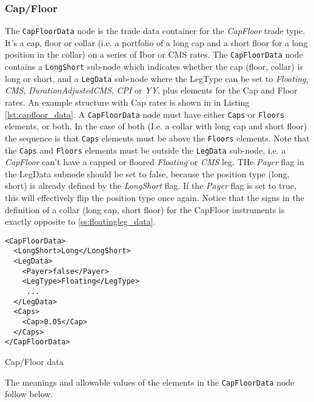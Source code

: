 \subsubsection{Cap/Floor}
\label{ss:capfloor}

The \lstinline!CapFloorData! node is the trade data container for the \emph{CapFloor} trade type.  It's a cap, floor or collar
(i.e. a portfolio of a long cap and a short floor for a long position in the collar) on a series of Ibor or CMS rates. The
\lstinline!CapFloorData! node contains a \lstinline!LongShort! sub-node which indicates whether the cap (floor, collar)
is long or short, and a \lstinline!LegData!  sub-node where the
LegType can be set to \emph{Floating}, \emph{CMS}, \emph{DurationAdjustedCMS}, \emph{CPI}
or \emph{YY}, plus elements for the Cap and Floor rates. An example structure with Cap rates is shown in in Listing
\ref{lst:capfloor_data}. A \lstinline!CapFloorData! node must have either \lstinline!Caps! or \lstinline!Floors!
elements, or both. In the case of both (I.e. a collar with long cap and short floor) the sequence is that  \lstinline!Caps! elements must be above the \lstinline!Floors! elements. Note that 
the \lstinline!Caps! and \lstinline!Floors! elements must be outside the \lstinline!LegData! sub-node, i.e. a \emph{CapFloor} 
can't have a capped or floored  \emph{Floating}  or \emph{CMS} leg.
THe \emph{Payer} flag in the LegData subnode should be set to false, because the position type (long, short) is already
defined by the \emph{LongShort} flag. If the \emph{Payer} flag is set to true, this will effectively flip the position
type once again. Notice that the signs in the definition of a collar (long cap, short floor) for the CapFloor
instruments is exactly opposite to \ref{ss:floatingleg_data}.

\begin{listing}[H]
\begin{verbatim}
<CapFloorData>
  <LongShort>Long</LongShort>
  <LegData>
    <Payer>false</Payer>
    <LegType>Floating</LegType>
     ...
  </LegData>
  <Caps>
    <Cap>0.05</Cap>
  </Caps>
</CapFloorData>
\end{verbatim}
\caption{Cap/Floor data}
\label{lst:capfloor_data}
\end{listing}

The meanings and allowable values of the elements in the \lstinline!CapFloorData!  node follow below.

